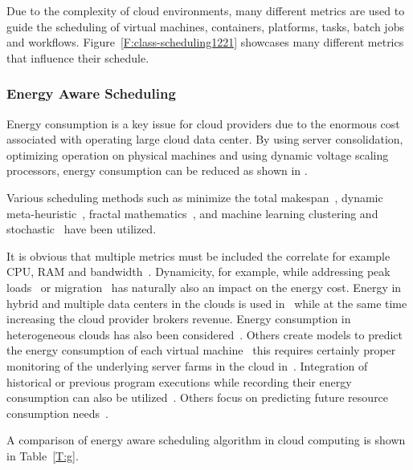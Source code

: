 \documentclass[final,5p,times,twocolumn]{elsarticle}
\begin{document}
Due to the complexity of cloud environments, many different metrics
are used to guide the scheduling of virtual machines, containers,
platforms, tasks, batch jobs and
workflows. Figure~\ref{F:class-scheduling1221} showcases many
different metrics that influence their schedule.  


\subsubsection{Energy Aware Scheduling}\label{sec:energy}



Energy consumption is a key issue for cloud providers due to the
enormous cost associated with operating large cloud data center. By
using server consolidation, optimizing operation on physical machines
and using dynamic voltage scaling processors, energy consumption can
be reduced as shown in \cite{las09dvfs,las10dvfs,calheiros2014energy}.

Various scheduling methods such as minimize the total
makespan~\cite{bessis2013using}, dynamic
meta-heuristic~\cite{bi2017application}, fractal
mathematics~\cite{duan2016energy}, and machine learning clustering and
stochastic~\cite{bui2016energy} have been utilized.


It is obvious that multiple metrics must be included the correlate for
example CPU, RAM and bandwidth~\cite{zhu2017three}. Dynamicity, for
example, while addressing peak loads~\cite{duan2016energy} or
migration~\cite{beloglazov2010energy} has naturally also an impact on
the energy cost. Energy in hybrid and multiple data centers in the
clouds is used
in~\cite{quarati2013hybrid,garg2011environment,gai2016dynamic} while
at the same time increasing the cloud provider brokers revenue. Energy
consumption in heterogeneous clouds has also been
considered~\cite{ding2015energy}.  Others create models to predict the
energy consumption of each virtual machine~\cite{kim2014energy} this
requires certainly proper monitoring of the underlying server farms in
the cloud in~\cite{van2012comparison}. Integration of historical or
previous program executions while recording their energy consumption
can also be utilized~\cite{hu2010scheduling}. Others focus on
predicting future resource consumption needs~\cite{dabbagh2015energy}.






A comparison of energy aware scheduling algorithm in cloud computing is shown in
Table~\ref{T:g}.
\end{document}
